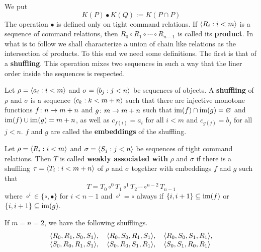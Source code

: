 We put
\begin{equation}
K(P) \bullet K(Q) := K(P \cap P)
\end{equation}
The operation $\bullet$ is defined only on tight command relations.
If $\langle R_i : i < m\rangle$ is a sequence of command relations,
then $R_0 \circ R_1 \circ \dotsb \circ R_{n-1}$ is called its
\textbf{product}. In what is to follow we shall characterize a
union of chain like relations as the intersection of products.
To this end we need some definitions. The first is that of
a \textbf{shuffling}. This operation mixes two sequences in such a
way that the liner order inside the sequences is respected.
\begin{defn}
Let $\rho = \langle a_i : i < m\rangle$ and $\sigma =
\langle b_j : j < n\rangle$ be sequences of objects.
A \textbf{shuffling} of $\rho$ and $\sigma$ is a sequence
$\langle c_k : k < m+n\rangle$ such that there are injective
monotone functions $f \colon n \rightarrow m+n$ and $g \colon m \rightarrow m+n$
such that $\operatorname{im}(f) \cap \operatorname{im}(g) = \varnothing$ and $\operatorname{im}(f) \cup \operatorname{im}(g) 
= m+n$, as well as $c_{f(i)} = a_i$ for all $i < m$ and $c_{g(j)} = b_j$
for all $j < n$. $f$ and $g$ are called the \textbf{embeddings}
of the shuffling.
\end{defn}
\begin{defn}
Let $\rho = \langle R_i : i < m\rangle$ and $\sigma =
\langle S_j : j < n\rangle$ be sequences of tight command relations.
Then $T$ is called \textbf{weakly associated with} $\rho$ and
$\sigma$ if there is a shuffling $\tau = \langle T_i : i < m+n\rangle$
of $\rho$ and $\sigma$ together with embeddings $f$ and $g$
such that
\begin{equation}
T = T_0 \circ^0 T_1 \circ^1 T_2 \dotsb \circ^{n-2} T_{n-1}
\end{equation}
where $\circ^i \in \{\circ, \bullet\}$ for $i < n-1$
and $\circ^i = \circ$ always if $\{i, i+1\} \subseteq
\operatorname{im}(f)$ or $\{i,i+1\} \subseteq \operatorname{im}(g)$.
\end{defn}
If $m = n = 2$, we have the following shufflings.
\begin{equation}
\begin{array}{l}
\langle R_0, R_1, S_0, S_1\rangle, \quad \langle R_0, S_0, R_1, S_1\rangle, \quad
    \langle R_0, S_0, S_1, R_1\rangle,  \\
\langle S_0, R_0, R_1, S_1\rangle, \quad \langle S_0, R_0, S_1, R_1\rangle, \quad
    \langle S_0, S_1, R_0, R_1\rangle 
\end{array}
\end{equation}
